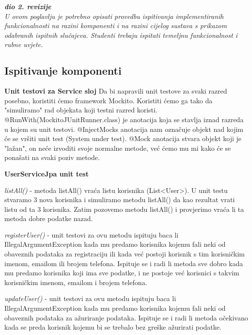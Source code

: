 			\textbf{\textit{dio 2. revizije}}\\
			
			 \textit{U ovom poglavlju je potrebno opisati provedbu ispitivanja implementiranih funkcionalnosti na razini komponenti i na razini cijelog sustava s prikazom odabranih ispitnih slučajeva. Studenti trebaju ispitati temeljnu funkcionalnost i rubne uvjete.}
	
			
			\subsection{Ispitivanje komponenti}

			\textbf{Unit testovi za Service sloj}
			\bigskip
			\newline
			Da bi napravili unit testove za svaki razred posebno, koristiti ćemo framework Mockito. Koristiti ćemo ga tako da "simuliramo" rad objekata koji testni razred koristi. @RunWith(MockitoJUnitRunner.class) je anotacija koja se stavlja iznad razreda u kojem su unit testovi. @InjectMocks anotacija nam označuje objekt nad kojim će se vršiti unit test (System under test). @Mock anotacija stvara objekt koji je "lažan", on neće izvoditi svoje normalne metode, već ćemo mu mi kako će se ponašati na svaki poziv metode.
			\bigskip
			\bigskip
			
			\bigskip
			\textbf{UserServiceJpa unit test}
			\bigskip
			
			\textit{listAll()} - metoda listAll() vraća listu korisnika (List<User>). U unit testu stvaramo 3 nova korisnika i simuliramo metodu listAll() da kao rezultat vrati listu od ta 3 korisnika. Zatim pozovemo metodu listAll() i provjerimo vraća li ta metoda dobre podatke nazad.
			
			\textit{registerUser()} - unit testovi za ovu metodu ispituju baca li IllegalArgumentException kada mu predamo korisnika kojemu fali neki od obaveznih podataka za registraciju ili kada već postoji korisnik s tim korisničkim imenom, emailom ili brojem telefona. Ispituje se i radi li metoda sve dobro kada mu predamo korisnika koji ima sve podatke, i ne postoje već korisnici s takvim korisničkim imenom, emailom i brojem telefona.
			
			\textit{updateUser()} - unit testovi za ovu metodu ispituju baca li IllegalArgumentException kada mu predamo korisnika kojemu fali neki od obaveznih podataka za ažuriranje podataka. Ispituje se i radi li metoda očekivano kada se preda korisnik kojemu bi se trebalo bez greške ažurirati podatke.
			
